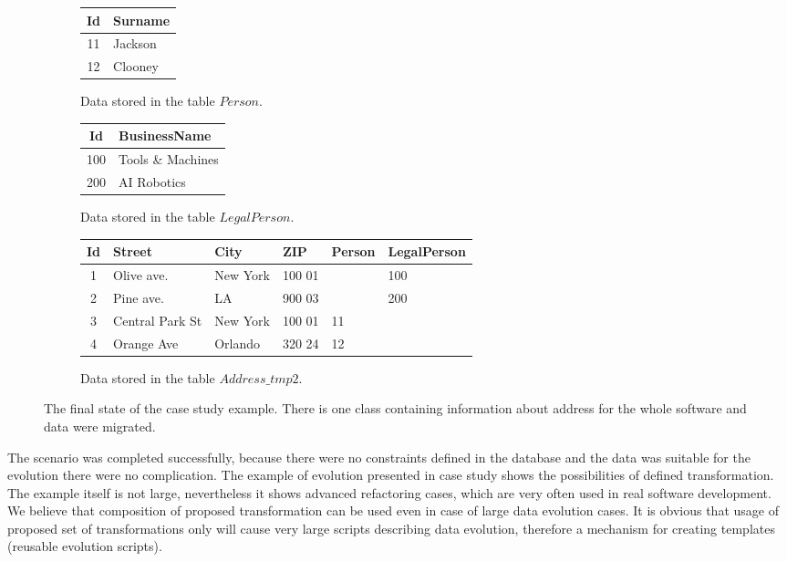 \documentclass[11pt]{article}
\begin{document}
\begin{figure}
\begin{subfigure}[b]{0.5\textwidth}
	\centering
	\begin{tabular}{| c | l |}
	 	\hline
		Id &  Surname \\ \hline  
		11 & Jackson  \\ \hline
		12 & Clooney  \\ \hline
	\end{tabular}
	\caption{Data stored in the table $Person$.}
\end{subfigure}
\begin{subfigure}[b]{0.5\textwidth}
	\centering
	\begin{tabular}{| c | l |}
	 	\hline
		Id &  BusinessName  \\ \hline  
		100 & Tools \& Machines  \\ \hline
		200 & AI Robotics \\ \hline
	\end{tabular}
	\caption{Data stored in the table $LegalPerson$.}
\end{subfigure}
\begin{subfigure}[b]{\textwidth}
	\centering
	\begin{tabular}{| c | l | l | l | l | l |}
	 	\hline
		Id & Street & City & ZIP & Person & LegalPerson\\ \hline  
		1 & Olive ave. & New York & 100 01 & & 100 \\ \hline
		2 & Pine ave. & LA & 900 03 & & 200  \\ \hline
		3 & Central Park St & New York & 100 01 & 11 &  \\ \hline
		4 & Orange Ave & Orlando & 320 24 & 12 &\\ \hline
	\end{tabular}
	\caption{Data stored in the table $Address\_tmp2$.}
\end{subfigure}

	\caption{The final state of the case study example. There is one class containing information about address for the whole software and data were migrated.}
\end{figure}

The scenario was completed successfully, because there were no constraints defined in the database and the data was suitable for the evolution there were no complication. The example of evolution presented in case study shows the possibilities of defined transformation. The example itself is not large, nevertheless it shows advanced refactoring cases, which are very often used in real software development. We believe that composition of proposed transformation can be used even in case of large data evolution cases. It is obvious that usage of proposed set of transformations only will cause very large scripts describing data evolution, therefore a mechanism for creating templates (reusable evolution scripts).
\end{document}
